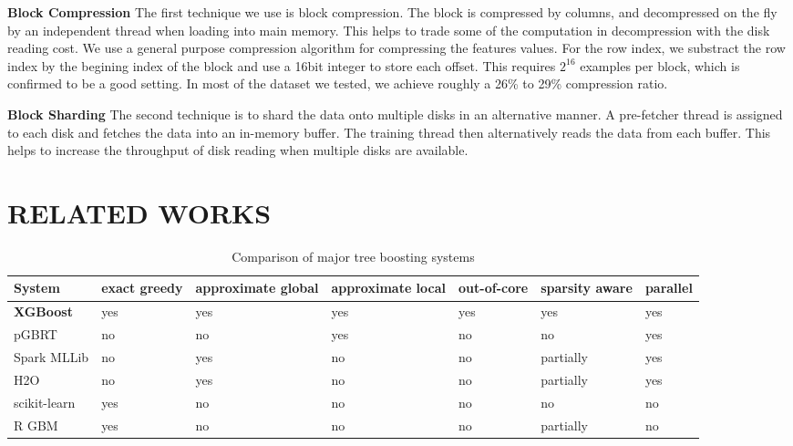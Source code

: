 \documentclass[sigconf]{acmart}
\begin{document}
\noindent \textbf{Block Compression} The first technique we use is block compression. The block is compressed by columns, 
and decompressed on the fly by an independent thread when loading into main memory. This helps to trade some of the
computation in decompression with the disk reading cost. We use a general purpose compression algorithm for compressing 
the features values. For the row index, we substract the row index by the begining index of the block and use a
16bit integer to store each offset. This requires $2^{16}$ examples per block, which is confirmed to be a good setting. 
In most of the dataset we tested, we achieve roughly a 26\% to 29\% compression ratio.

\noindent \textbf{Block Sharding} The second technique is to shard the data onto multiple disks in an alternative manner. 
A pre-fetcher thread is assigned to each disk and fetches the data into an in-memory buffer. The training thread then 
alternatively reads the data from each buffer. This helps to increase the throughput of disk reading when multiple disks 
are available.

\section{RELATED WORKS}
\label{sec:RELATED WORKS}

\begin{table}[!t] %
    \centering
    \caption{Comparison of major tree boosting systems}
    \begin{tabular}{|l|l|l|l|l|l|l|} %
         \hline
         System & exact greedy & approximate global & approximate local & out-of-core & sparsity aware & parallel \\ \hline
         \textbf{XGBoost} & yes & yes & yes & yes & yes & yes\\ \hline
         pGBRT & no & no & yes & no & no & yes\\ \hline
         Spark MLLib & no & yes & no & no & partially & yes\\ \hline
         H2O & no & yes & no & no & partially & yes\\ \hline
         scikit-learn & yes & no & no & no & no & no\\ \hline
         R GBM & yes & no & no & no & partially & no\\ \hline
    \end{tabular}
    \label{tab:Table1}
\end{table}
\end{document}
